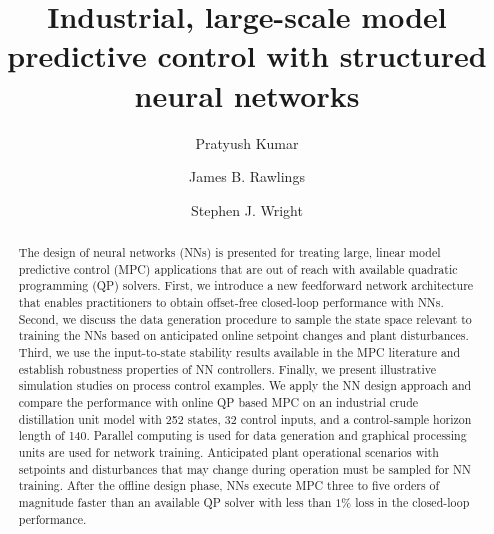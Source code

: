 \documentclass[preprint,5p, twocolumn, authoryear]{elsarticle}
\begin{document}
\begin{frontmatter}


\title{Industrial, large-scale model predictive control with structured neural
networks}

\author[label1]{Pratyush Kumar}

\author[label1]{James B. Rawlings}

\author[label2]{Stephen J. Wright}

\address[label1]{Department of Chemical Engineering, University of California, Santa Barbara, CA 93106, United States}
\address[label2]{Computer Sciences Department, University of Wisconsin-Madison, Madison, WI 53706, United States}

\begin{abstract}
The design of neural networks (NNs) is presented for treating large, linear
model predictive control (MPC) applications that are out of reach with available
quadratic programming (QP) solvers. First, we introduce a new feedforward
network architecture that enables practitioners to obtain offset-free
closed-loop performance with NNs. Second, we discuss the data generation
procedure to sample the state space relevant to training the NNs based on
anticipated online setpoint changes and plant disturbances. Third, we use the
input-to-state stability results available in the MPC literature and establish
robustness properties of NN controllers. Finally, we present illustrative
simulation studies on process control examples. We apply the NN design approach
and compare the performance with online QP based MPC on an industrial crude
distillation unit model with 252 states, 32 control inputs, and a control-sample
horizon length of 140. Parallel computing is used for data generation and
graphical processing units are used for network training. Anticipated plant
operational scenarios with setpoints and disturbances that may change during
operation must be sampled for NN training. After the offline design phase, NNs
execute MPC three to five orders of magnitude faster than an available QP solver
with less than $1\%$ loss in the closed-loop performance.
\end{abstract}


\end{frontmatter}
\end{document}
